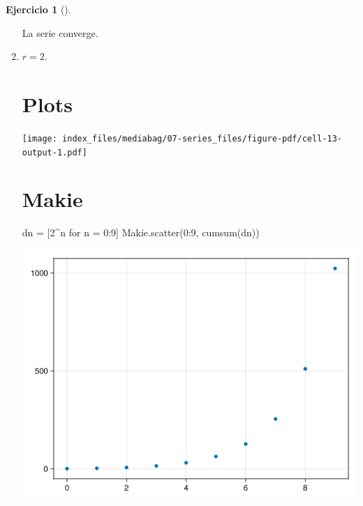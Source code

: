 \documentclass[
  a4paper,
]{scrreport}
\newenvironment{Shaded}{\begin{snugshade}}{\end{snugshade}}
\newcommand{\FloatTok}[1]{\textcolor[rgb]{0.68,0.00,0.00}{#1}}
\newcommand{\FunctionTok}[1]{\textcolor[rgb]{0.28,0.35,0.67}{#1}}
\newcommand{\NormalTok}[1]{\textcolor[rgb]{0.00,0.23,0.31}{#1}}
\newcommand{\OperatorTok}[1]{\textcolor[rgb]{0.37,0.37,0.37}{#1}}
\newcommand{\SpecialCharTok}[1]{\textcolor[rgb]{0.37,0.37,0.37}{#1}}
\newcommand{\StringTok}[1]{\textcolor[rgb]{0.13,0.47,0.30}{#1}}
\theoremstyle{definition}
\newtheorem{exercise}{Ejercicio}[chapter]
\theoremstyle{remark}
\begin{document}
\begin{exercise}[]
\begin{tcolorbox}
\begin{enumerate}
  La serie converge.
\item
  \(r=2\).

  \section{Plots}

\begin{Shaded}
\end{Shaded}

  \texttt{[image: index\_files/mediabag/07-series\_files/figure-pdf/cell-13-output-1.pdf]}

  \section{Makie}

\begin{Shaded}
\begin{Highlighting}[]
\NormalTok{dn }\OperatorTok{=}\NormalTok{ [}\FloatTok{2}\OperatorTok{\^{}}\NormalTok{n for n }\OperatorTok{=} \FloatTok{0}\OperatorTok{:}\FloatTok{9}\NormalTok{]}
\NormalTok{Makie.}\FunctionTok{scatter}\NormalTok{(}\FloatTok{0}\OperatorTok{:}\FloatTok{9}\NormalTok{, }\FunctionTok{cumsum}\NormalTok{(dn))}
\end{Highlighting}
\end{Shaded}

  \includegraphics{07-series_files/figure-pdf/cell-14-output-1.png}


\end{enumerate}
\end{tcolorbox}
\end{exercise}
\end{document}
